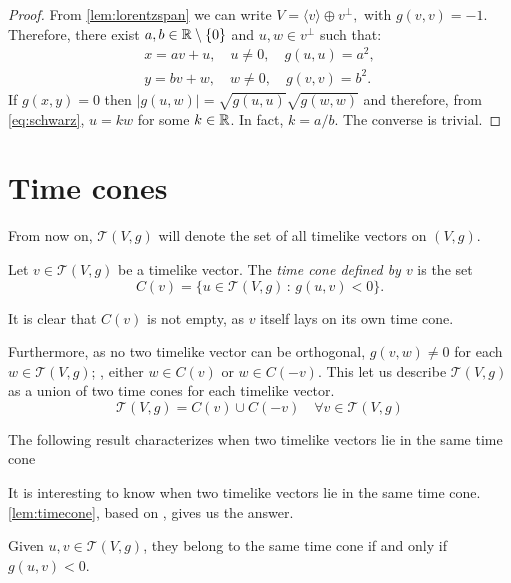 \begin{proof}
    From \autoref{lem:lorentzspan} we can write $V=\langle v \rangle \oplus v^{\perp},$ with $g(v,v)=-1$. Therefore, there exist $a,b \in \mathbb{R}\setminus\{0\}$ and $u,w \in v^\perp$ such that:
    \begin{align*}
        x=av+u, \quad u\neq 0, \quad g(u,u)=a^2,\\
        y=bv+w, \quad w\neq 0, \quad g(v,v)=b^2.
    \end{align*}
    If $g(x,y)=0$ then $\lvert g(u,w) \rvert = \sqrt{g(u,u)}\sqrt{g(w,w)}$ and therefore, from \autoref{eq:schwarz}, $u=kw$ for some $k\in \mathbb{R}$. In fact, $k=a/b$. The converse is trivial.
\end{proof}

\section{Time cones}

From now on, $\mathcal{T}(V,g)$ will denote the set of all timelike vectors on $(V,g)$.

\begin{definition}
	Let $v\in \mathcal{T}(V,g)$ be a timelike vector. The \emph{time cone defined by $v$} is the set
	\[
	C(v)=\{u\in\mathcal{T}(V,g)\, : \, g(u,v)<0 \}.
	\]
\end{definition}

It is clear that $C(v)$ is not empty, as $v$ itself lays on its own time cone.

Furthermore, as no two timelike vector can be orthogonal, $g(v,w) \neq 0$ for each $w \in \mathcal{T}(V,g)$; \ie, either $w\in C(v)$ or $w\in C(-v)$. This let us describe $\mathcal{T}(V,g)$ as a union of two time cones for each timelike vector.
\[
\mathcal{T}(V,g) = C(v) \cup C(-v) \quad \forall v\in \mathcal{T}(V,g)
\]

The following result characterizes when two timelike vectors lie in the same time cone 

It is interesting to know when two timelike vectors lie in the same time cone. \autoref{lem:timecone}, based on \cite[Lemma 5.29]{oneill83}, gives us the answer.

\begin{lemma}\label{lem:timecone}
Given $u,v\in \mathcal{T}(V,g)$, they belong to the same time cone if and only if $g(u,v)<0$.
\end{lemma}

